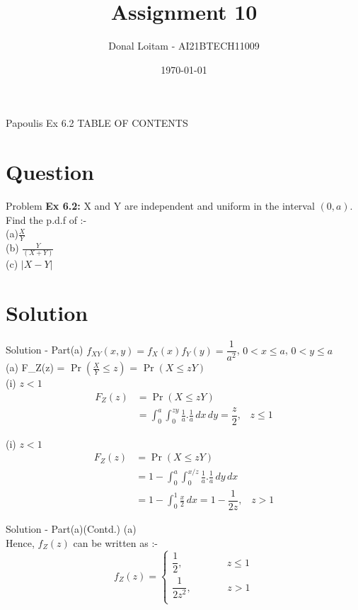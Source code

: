 \documentclass{beamer}
\title{Assignment 10}
\author{Donal Loitam - AI21BTECH11009}
\date{\today}
\providecommand{\pr}[1]{\ensuremath{\Pr\left(#1\right)}}
\providecommand{\brak}[1]{\ensuremath{\left(#1\right)}}
\begin{document}
\begin{frame}
    \titlepage 
\end{frame}

\logo{}


\begin{frame}{Papoulis Ex 6.2}
TABLE OF CONTENTS
    \tableofcontents
\end{frame}


\section{Question}
\begin{frame}{Problem}
\textbf{Ex 6.2:}
X and Y are independent and uniform in the interval \brak{0,a}. Find the p.d.f of :- \\(a)\;\;\;\;$ \frac{X}{Y}$ \\
   (b) $\frac{Y}{(X+Y)}$ \\
   (c) \small{$\left|X-Y\right|$} \\
   \end{frame}

\section{Solution}
\begin{frame}{Solution - Part(a)}
  $f_{XY}(x,y) = f_X(x)f_Y(y) = \dfrac{1}{a^2}$, \;\;\;\;\;\;   $0 < x \le a$, \;\; $0 < y \le a$\\
  (a)  F_Z(z) = \pr{\tfrac{X}{Y} \le z} = \pr{X \le zY}\\ 
  (i) \;  $ z < 1$ \\
 \begin{align}
  F_Z(z) &= \pr{X \le zY}\\
         &=  \int_{0}^{a} \int_{0}^{zy} \frac{1}{a}.\frac{1}{a} \,dx \,dy = \dfrac{z}{2} ,\;\;\; z \le 1
\end{align}
  
   (i) \;  $ z < 1$ \;\;\;
 \begin{align}
  F_Z(z) &= \pr{X \le zY}\\
         &= 1 - \int_{0}^{a} \int_{0}^{x/z} \frac{1}{a}.\frac{1}{a} \,dy \,dx \\
         &= 1 - \int_{0}^{1} \frac{x}{2} \,dx = 1 - \dfrac{1}{2z} ,\;\;\; z > 1
\end{align}
\end{frame}

\begin{frame}{Solution - Part(a)(Contd.)}
(a) \\
\;\;\;\;\;\;\;\;\;\;\;\;\;Hence, $f_Z(z)$ can be written as :-
        \[
        f_Z(z)=\left\{
                \begin{array}{ll}
                  \dfrac{1}{2}  ,\;\;\;\;\;\;\;\;\;\;\;\;\;\;\;\;   z \le 1 \\
                  \dfrac{1}{2z^2} , \;\;\;\;\;\;\;\;\;\;\;  \; \; z > 1  \\
                  \end{array}
              \right.
       \]
\end{frame}
\end{document}
